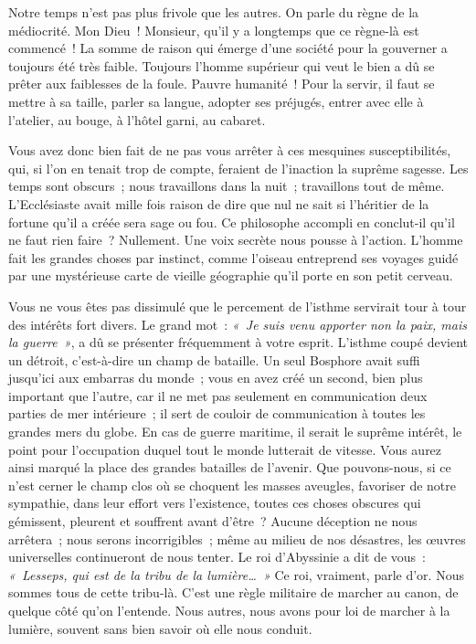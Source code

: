 \documentclass[french,twoside]{book} %
\newcommand\persName[1]{#1}
\newcommand\placeName[1]{#1}
\begin{document}
Notre temps n’est pas plus frivole que les autres. On parle du règne de la médiocrité. Mon Dieu ! Monsieur, qu’il y a longtemps que ce règne-là est commencé ! La somme de raison qui émerge d’une société pour la gouverner a toujours été très faible. Toujours l’homme supérieur qui veut le bien a dû se prêter aux faiblesses de la foule. Pauvre humanité ! Pour la servir, il faut se mettre à sa taille, parler sa langue, adopter ses préjugés, entrer avec elle à l’atelier, au bouge, à l’hôtel garni, au cabaret.\par
Vous avez donc bien fait de ne pas vous arrêter à ces mesquines susceptibilités, qui, si l’on en tenait trop de compte, feraient de l’inaction la suprême sagesse. Les temps sont obscurs ; nous travaillons dans la nuit ; travaillons tout de même. L’{\persName Ecclésiaste} avait mille fois raison de dire que nul ne sait si l’héritier de la fortune qu’il a créée sera sage ou fou. Ce philosophe accompli en conclut-il qu’il ne faut rien faire ? Nullement. Une voix secrète nous pousse à l’action. L’homme fait les grandes choses par instinct, comme l’oiseau entreprend ses voyages guidé par une mystérieuse carte de vieille géographie qu’il porte en son petit cerveau.\par
Vous ne vous êtes pas dissimulé que le percement de l’isthme servirait tour à tour des intérêts fort divers. Le grand mot : \emph{« Je suis venu apporter non la paix, mais la guerre »}, a dû se présenter fréquemment à votre esprit. L’isthme coupé devient un détroit, c’est-à-dire un champ de bataille. Un seul {\placeName Bosphore} avait suffi jusqu’ici aux embarras du monde ; vous en avez créé un second, bien plus important que l’autre, car il ne met pas seulement en communication deux parties de mer intérieure ; il sert de couloir de communication à toutes les grandes mers du globe. En cas de guerre maritime, il serait le suprême intérêt, le point pour l’occupation duquel tout le monde lutterait de vitesse. Vous aurez ainsi marqué la place des grandes batailles de l’avenir. Que pouvons-nous, si ce n’est cerner le champ clos où se choquent les masses aveugles, favoriser de notre sympathie, dans leur effort vers l’existence, toutes ces choses obscures qui gémissent, pleurent et souffrent avant d’être ? Aucune déception ne nous arrêtera ; nous serons incorrigibles ; même au milieu de nos désastres, les œuvres universelles continueront de nous tenter. Le {\persName roi d’Abyssinie} a dit de vous : \emph{« {\persName Lesseps}, qui est de la tribu de la lumière… »} Ce roi, vraiment, parle d’or. Nous sommes tous de cette tribu-là. C’est une règle militaire de marcher au canon, de quelque côté qu’on l’entende. Nous autres, nous avons pour loi de marcher à la lumière, souvent sans bien savoir où elle nous conduit.\par
\end{document}
